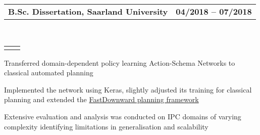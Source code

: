 \documentclass[]{lukas-cv-openfont}
\makeatletter
\newcommand{\headerrow}[2]
{\begin{tabular*}{\linewidth}{l@{\extracolsep{\fill}}r}
	\fontspec{Helvetica}\fontsize{12pt}{12pt}\selectfont\bfseries{\color{subheadings}#1} &
	\fontspec{Helvetica}\fontsize{12pt}{12pt}\selectfont\bfseries{\color{subheadings}#2} \\
\end{tabular*}}
\newcommand{\locationrow}[2]
{\begin{tabular*}{\linewidth}{l@{\extracolsep{\fill}}r}
        \color{headings}\scshape\fontspec{Heiti TC Medium}\fontsize{10pt}{12pt}\selectfont{#1}  &
        \color{headings}\scshape\fontspec{Heiti TC Medium}\fontsize{10pt}{12pt}\selectfont{#2}  \\
\end{tabular*}}
\makeatother
\begin{document}

\noindent
\headerrow{B.Sc. Dissertation, Saarland University}{04/2018 -- 07/2018}
\\
\locationrow{Foundations of Artificial Intelligence (FAI) Group}{}
\begin{tightitemize}{1.7em}
    \item Transferred domain-dependent policy learning Action-Schema Networks to
    classical automated planning
    \item Implemented the network using Keras, slightly adjusted its training for classical planning and extended 
    the \href{http://www.fast-downward.org}{FastDownward planning framework}
    \item Extensive evaluation and analysis was conducted on IPC domains of varying complexity identifying
    limitations in generalisation and scalability
\end{tightitemize}
\largesectionsep
\end{document}
